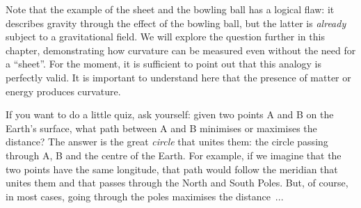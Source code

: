 \begin{description}[style=multiline,leftmargin=2em,labelwidth=1.5em]
\item[4.]\hypertarget{note:03-04}{}Note that the example of the sheet and the bowling ball has a logical flaw: it
describes gravity through the effect of the bowling ball, but the latter is
\emph{already} subject to a gravitational field. We will explore the question further in
this chapter, demonstrating how curvature can be measured even without the need for a
``sheet''. For the moment, it is sufficient to point out that this analogy is perfectly
valid. It is important to understand here that the presence of matter or energy produces
curvature.

\item[5.]\hypertarget{note:03-05}{}If you want to do a little quiz, ask yourself: given two points A and B on the Earth's
surface, what path between A and B minimises or maximises the distance? The answer is
the great \emph{circle} that unites them: the circle passing through A, B and the centre
of the Earth. For example, if we imagine that the two points have the same longitude,
that path would follow the meridian that unites them and that passes through the North
and South Poles. But, of course, in most cases, going through the poles maximises the
distance~...

\end{description}
